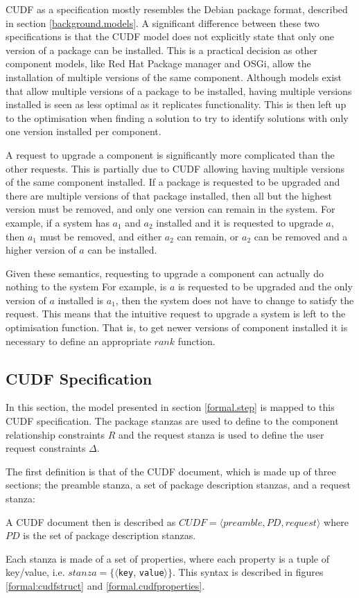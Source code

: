 CUDF as a specification mostly resembles the Debian package format, described in section \ref{background.models}.
A significant difference between these two specifications is that the CUDF model does not explicitly state that only one version of a package can be installed.
This is a practical decision as other component models, like Red Hat Package manager and OSGi, allow the installation of multiple versions of the same component.
Although models exist that allow multiple versions of a package to be installed, having multiple versions installed is seen as less optimal as it replicates functionality. 
This is then left up to the optimisation when finding a solution to try to identify solutions with only one version installed per component.

A request to upgrade a component is significantly more complicated than the other requests.
This is partially due to CUDF allowing having multiple versions of the same component installed.
If a package is requested to be upgraded and there are multiple versions of that package installed,
then all but the highest version must be removed, and only one version can remain in the system.
For example, if a system has $a_1$ and $a_2$ installed and it is requested to upgrade $a$,
then $a_1$ must be removed, and either $a_2$ can remain, or $a_2$ can be removed and a higher version of $a$ can be installed.

Given these semantics, requesting to upgrade a component can actually do nothing to the system
For example, is $a$ is requested to be upgraded and the only version of $a$ installed is $a_1$, then the system does not have to change to satisfy the request.
This means that the intuitive request to upgrade a system is left to the optimisation function.
That is, to get newer versions of component installed it is necessary to define an appropriate $rank$ function.

\subsection{CUDF Specification}
In this section, the model presented in section \ref{formal.step} is mapped to this CUDF specification.
The package stanzas are used to define to the component relationship constraints $R$ and the request stanza is used to define the user request constraints $\Delta$. 

The first definition is that of the CUDF document, which is made up of three sections; the preamble stanza, a set of package description stanzas, and a request stanza:
\begin{defs}
A CUDF document then is described as $CUDF = \langle preamble, PD, request \rangle$ where $PD$ is the set of package description stanzas.
\end{defs} 
Each stanza is made of a set of properties, where each property is a tuple of key/value, i.e. $stanza = \{\langle $\verb+key+, \verb+value+$\rangle\}$.
This syntax is described in figures \ref{formal:cudfstruct} and \ref{formal.cudfproperties}.

